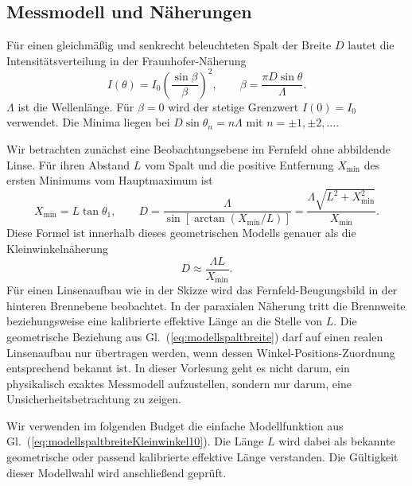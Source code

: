 \subsection{Messmodell und Näherungen}

Für einen gleichmäßig und senkrecht beleuchteten Spalt der Breite $D$ lautet
die Intensitäts\-verteilung in der Fraunhofer-Näherung
\begin{equation}
I(\theta)=I_0\left(\frac{\sin\beta}{\beta}\right)^2,
\qquad \beta=\frac{\pi D\sin\theta}{\Lambda}.
\label{eq:spaltfunktion}
\end{equation}
$\Lambda$ ist die Wellenlänge. Für $\beta=0$ wird der stetige Grenzwert
$I(0)=I_0$ verwendet. Die Minima liegen bei
$D\sin\theta_n=n\Lambda$ mit $n=\pm1,\pm2,\dots$.

Wir betrachten zunächst eine Beobachtungsebene im Fernfeld ohne
abbildende Linse. Für ihren Abstand $L$ vom Spalt und die positive
Entfernung $X_{\mathrm{min}}$ des ersten Minimums vom Hauptmaximum ist
\begin{equation}
X_{\mathrm{min}}=L\tan\theta_1,\qquad
D=\frac{\Lambda}{\sin[\arctan(X_{\mathrm{min}}/L)]}
=\frac{\Lambda\sqrt{L^2+X_{\mathrm{min}}^2}}{X_{\mathrm{min}}}.
\label{eq:modellspaltbreite}
\end{equation}
Diese Formel ist innerhalb dieses geometrischen Modells genauer als die
Kleinwinkelnäherung
\begin{equation}
D\approx\frac{\Lambda L}{X_{\mathrm{min}}}.
\label{eq:modellspaltbreiteKleinwinkel10}
\end{equation}
Für einen Linsenaufbau wie in der Skizze wird das Fernfeld-Beugungsbild
in der hinteren Brennebene beobachtet. In der paraxialen Näherung tritt
die Brennweite beziehungsweise eine kalibrierte effektive Länge an die
Stelle von $L$.
Die geometrische Beziehung aus Gl.~(\ref{eq:modellspaltbreite}) darf auf
einen realen Linsenaufbau nur übertragen werden, wenn dessen
Winkel-Positions-Zuordnung entsprechend bekannt ist.
In dieser Vorlesung geht es nicht darum, ein physikalisch exaktes Messmodell aufzustellen, sondern nur darum, eine Unsicherheitsbetrachtung zu zeigen.

Wir verwenden im folgenden Budget die einfache Modellfunktion aus
Gl.~(\ref{eq:modellspaltbreiteKleinwinkel10}). Die Länge $L$ wird dabei
als bekannte geometrische oder passend kalibrierte effektive Länge
verstanden. Die Gültigkeit dieser Modellwahl wird anschließend geprüft.

